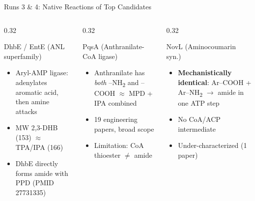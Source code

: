 \documentclass[aspectratio=169, 11pt]{beamer}
\begin{document}
\begin{frame}{Runs 3 \& 4: Native Reactions of Top Candidates}
\vspace{4pt}
\begin{columns}[T]
\begin{column}{0.32\textwidth}
\begin{block}{\scriptsize DhbE / EntE (ANL superfamily)}
\vspace{-2pt}
\begin{itemize}\scriptsize
\setlength\itemsep{0pt}
\item Aryl-AMP ligase: adenylates aromatic acid, then amine attacks
\item MW 2,3-DHB (153) $\approx$ TPA/IPA (166)
\item DhbE directly forms amide with PPD (PMID 27731335)
\end{itemize}
\end{block}
\end{column}
\begin{column}{0.32\textwidth}
\begin{block}{\scriptsize PqsA (Anthranilate-CoA ligase)}
\vspace{-2pt}
\begin{itemize}\scriptsize
\setlength\itemsep{0pt}
\item Anthranilate has \textit{both} --NH\textsubscript{2} and --COOH $\approx$ MPD + IPA combined
\item 19 engineering papers, broad scope
\item Limitation: CoA thioester $\neq$ amide
\end{itemize}
\end{block}
\end{column}
\begin{column}{0.32\textwidth}
\begin{block}{\scriptsize NovL (Aminocoumarin syn.)}
\vspace{-2pt}
\begin{itemize}\scriptsize
\setlength\itemsep{0pt}
\item \textbf{Mechanistically identical}: Ar--COOH + Ar--NH\textsubscript{2} $\rightarrow$ amide in one ATP step
\item No CoA/ACP intermediate
\item Under-characterized (1 paper)
\end{itemize}
\end{block}
\end{column}
\end{columns}
\end{frame}
\end{document}
